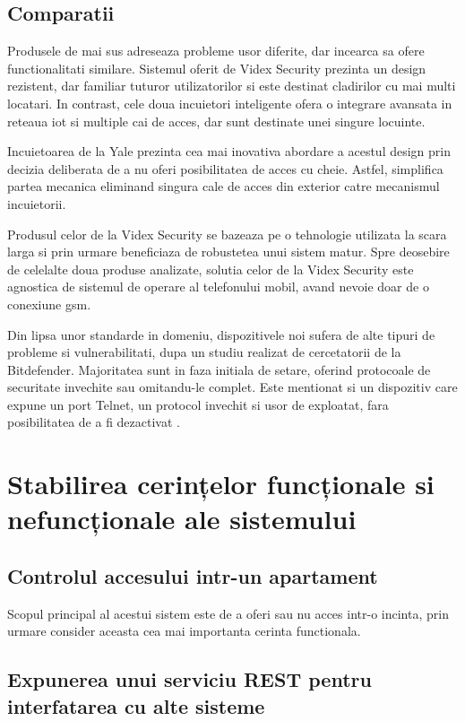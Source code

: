 \subsection {Comparatii}

Produsele de mai sus adreseaza probleme usor diferite, dar incearca sa ofere functionalitati similare. Sistemul oferit de Videx Security prezinta un design rezistent, dar familiar tuturor utilizatorilor si este destinat cladirilor cu mai multi locatari. In contrast, cele doua incuietori inteligente ofera o integrare avansata in reteaua \acrshort{iot} si multiple cai de acces, dar sunt destinate unei singure locuinte.

Incuietoarea de la Yale prezinta cea mai inovativa abordare a acestul design prin decizia deliberata de a nu oferi posibilitatea de acces cu cheie. Astfel, simplifica partea mecanica eliminand singura cale de acces din exterior catre mecanismul incuietorii.

Produsul celor de la Videx Security se bazeaza pe o tehnologie utilizata la scara larga si prin urmare beneficiaza de robustetea unui sistem matur. Spre deosebire de celelalte doua produse analizate, solutia celor de la Videx Security este agnostica de sistemul de operare al telefonului mobil, avand nevoie doar de o conexiune \acrshort{gsm}.

Din lipsa unor standarde in domeniu, dispozitivele noi sufera de alte tipuri de probleme si vulnerabilitati, dupa un studiu realizat de cercetatorii de la Bitdefender. Majoritatea sunt in faza initiala de setare, oferind protocoale de securitate invechite sau omitandu-le complet. Este mentionat si un dispozitiv care expune un port Telnet, un protocol invechit si usor de exploatat, fara posibilitatea de a fi dezactivat \cite{Bitdefender2016IoT}.

\section {Stabilirea cerințelor funcționale si nefuncționale ale sistemului}

\subsection{Controlul accesului intr-un apartament}

Scopul principal al acestui sistem este de a oferi sau nu acces intr-o incinta, prin urmare consider aceasta cea mai importanta cerinta functionala.

\subsection{Expunerea unui serviciu REST pentru interfatarea cu alte sisteme}

